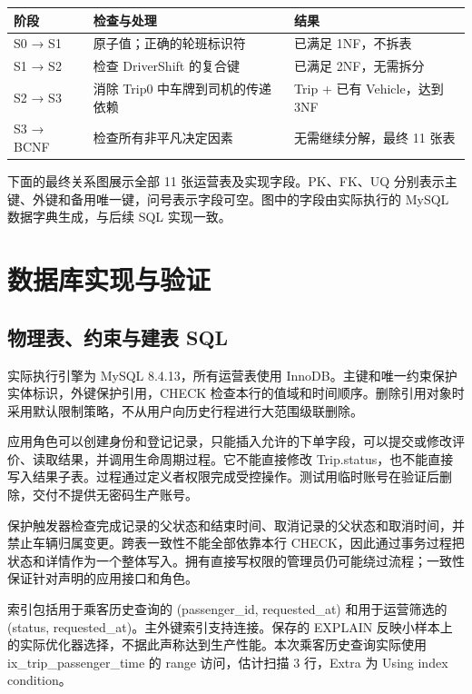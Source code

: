 \documentclass[11pt,a4paper]{article}
\begin{document}
\par\begingroup\small\noindent
\begin{tabularx}{\linewidth}{p{2.5cm}p{6.2cm}X}
\toprule
阶段 & 检查与处理 & 结果\\\midrule
S0 → S1 & 原子值；正确的轮班标识符 & 已满足 1NF，不拆表\\
S1 → S2 & 检查 DriverShift 的复合键 & 已满足 2NF，无需拆分\\
S2 → S3 & 消除 Trip0 中车牌到司机的传递依赖 & Trip + 已有 Vehicle，达到 3NF\\
S3 → BCNF & 检查所有非平凡决定因素 & 无需继续分解，最终 11 张表\\
\bottomrule
\end{tabularx}
\par\endgroup
下面的最终关系图展示全部 11 张运营表及实现字段。PK、FK、UQ 分别表示主键、外键和备用唯一键，问号表示字段可空。图中的字段由实际执行的 MySQL 数据字典生成，与后续 SQL 实现一致。

\clearpage

\endgroup
\clearpage
\section{数据库实现与验证}
\subsection{物理表、约束与建表 SQL}
实际执行引擎为 MySQL 8.4.13，所有运营表使用 InnoDB。主键和唯一约束保护实体标识，外键保护引用，CHECK 检查本行的值域和时间顺序。删除引用对象时采用默认限制策略，不从用户向历史行程进行大范围级联删除。

应用角色可以创建身份和登记记录，只能插入允许的下单字段，可以提交或修改评价、读取结果，并调用生命周期过程。它不能直接修改 Trip.status，也不能直接写入结果子表。过程通过定义者权限完成受控操作。测试用临时账号在验证后删除，交付不提供无密码生产账号。

保护触发器检查完成记录的父状态和结束时间、取消记录的父状态和取消时间，并禁止车辆归属变更。跨表一致性不能全部依靠本行 CHECK，因此通过事务过程把状态和详情作为一个整体写入。拥有直接写权限的管理员仍可能绕过流程；一致性保证针对声明的应用接口和角色。

索引包括用于乘客历史查询的 (passenger\_\allowbreak{}id, requested\_\allowbreak{}at) 和用于运营筛选的 (status, requested\_\allowbreak{}at)。主外键索引支持连接。保存的 EXPLAIN 反映小样本上的实际优化器选择，不据此声称达到生产性能。本次乘客历史查询实际使用 ix\_\allowbreak{}trip\_\allowbreak{}passenger\_\allowbreak{}time 的 range 访问，估计扫描 3 行，Extra 为 Using index condition。
\end{document}
